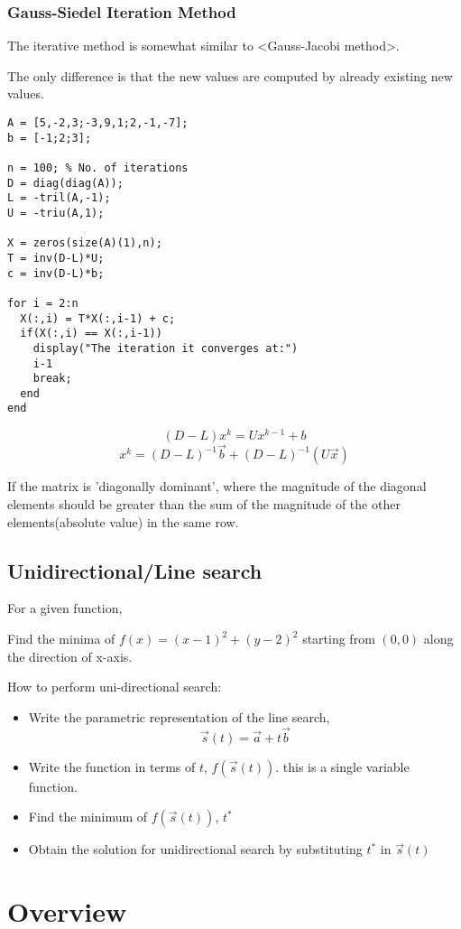 \documentclass[11pt]{report}
\begin{document}
\section{Gauss-Siedel Iteration Method}
\label{sec:orgd14f403}
The iterative method is somewhat similar to <Gauss-Jacobi method>.

The only difference is that the new values are computed by already existing new values.

\begin{verbatim}
A = [5,-2,3;-3,9,1;2,-1,-7];
b = [-1;2;3];

n = 100; % No. of iterations
D = diag(diag(A));
L = -tril(A,-1);
U = -triu(A,1);

X = zeros(size(A)(1),n);
T = inv(D-L)*U;
c = inv(D-L)*b;

for i = 2:n
  X(:,i) = T*X(:,i-1) + c;
  if(X(:,i) == X(:,i-1))
    display("The iteration it converges at:")
    i-1
    break;
  end
end
\end{verbatim}

$$(D-L)x^{k} = Ux^{k-1} + b$$
$$x^{k} = (D-L)^{-1} \vec{b} + (D-L)^{-1}(U \vec{x})$$

If the matrix is 'diagonally dominant', where the magnitude of the diagonal elements should be greater than the sum of the magnitude of the other elements(absolute value) in the same row.
\chapter{Unidirectional/Line search}
\label{sec:org5ce430e}
For a given function,

Find the minima of \(f(x) = (x-1)^2 + (y-2)^2\) starting from \((0,0)\) along the direction of x-axis.

How to perform uni-directional search:
\begin{itemize}
\item Write the parametric representation of the line search, $$\vec{s}(t) = \vec{a} + t\vec{b}$$
\item Write the function in terms of \(t\), \(f(\vec{s}(t))\). this is a single variable function.
\item Find the minimum of \(f(\vec{s}(t))\), \(t^*\)
\item Obtain the solution for unidirectional search by substituting \(t^*\) in \(\vec{s}(t)\)
\end{itemize}
\part{Overview}
\label{sec:orgd36496f}
\end{document}
